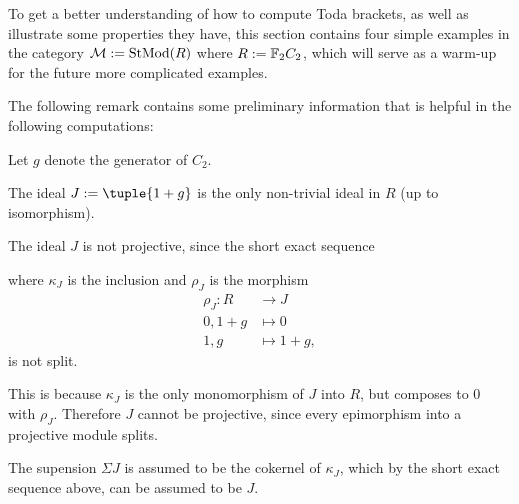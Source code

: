 To get a better understanding of how to compute Toda brackets, as well as illustrate some properties they have, this section contains four simple examples in the category \( {\mathcal{M}} := \operatorname{StMod}(R) \) where \( R := {\mathbb{F}}_2 C_2 \), which will serve as a warm-up for the future more complicated examples.

The following remark contains some preliminary information that is helpful in the following computations:

\begin{remark}
	\label{rem:toda_bracket_examples_properties}
    Let \( g \) denote the generator of \( C_2 \).

    The ideal \( J := \tuple{1 + g} \) is the only non-trivial ideal in \( R \) (up to isomorphism).

    The ideal \( J \) is not projective, since the short exact sequence
    \begin{center}
    \end{center}
    where \( \kappa_J \) is the inclusion and \( \rho_J \) is the morphism
    \begin{align*}
        \rho_J: R &\to J \\
        0, 1 + g &\mapsto 0 \\
        1, g &\mapsto 1 + g,
    \end{align*}
    is not split.

    This is because \( \kappa_J \) is the only monomorphism of \( J \) into \( R \), but composes to \( 0 \) with \( \rho_J \). Therefore \( J \) cannot be projective, since every epimorphism into a projective module splits.

    The supension \( \Sigma J \) is assumed to be the cokernel of \( \kappa_J \), which by the short exact sequence above, can be assumed to be \( J \).

\end{remark}

